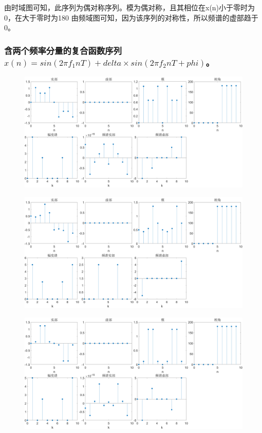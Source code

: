 \documentclass{../source/Experiment}
\begin{document}
由时域图可知，此序列为偶对称序列。模为偶对称，且其相位在x(n)小于零时为0，在大于零时为180\degree
由频域图可知，因为该序列的对称性，所以频谱的虚部趋于 0。

\subsubsection{含两个频率分量的复合函数序列$x(n)=sin(2\pi f_1 n T)+delta \times sin(2\pi f_2 nT+phi)$。}

\begin{figure}[H]
    \centering
    \includegraphics[width = \textwidth]{src/2_1_5a.png}
\end{figure}
\begin{figure}[H]
    \centering
    \includegraphics[width = \textwidth]{src/2_1_5b.png}
\end{figure}
\begin{figure}[H]
    \centering
    \includegraphics[width = \textwidth]{src/2_1_5c.png}
\end{figure}
\end{document}
